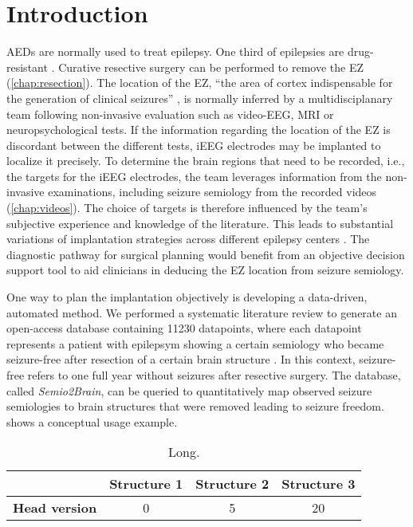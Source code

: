 \section{Introduction}

\Acp{AED} are normally used to treat epilepsy.
One third of epilepsies are drug-resistant \cite{engel_what_2016}.
Curative resective surgery can be performed to remove the \ac{EZ} (\cref{chap:resection}).
The location of the \ac{EZ}, ``the area of cortex indispensable for the generation of clinical seizures'' \cite{rosenow_presurgical_2001}, is normally inferred by a multidisciplanary team following non-invasive evaluation such as video-\ac{EEG}, \ac{MRI} or neuropsychological tests.
If the information regarding the location of the \ac{EZ} is discordant between the different tests, \ac{iEEG} electrodes may be implanted to localize it precisely.
To determine the brain regions that need to be recorded, i.e., the targets for the \ac{iEEG} electrodes, the team leverages information from the non-invasive examinations, including seizure semiology from the recorded videos (\cref{chap:videos}).
The choice of targets is therefore influenced by the team's subjective experience and knowledge of the literature.
This leads to substantial variations of implantation strategies across different epilepsy centers \cite{tufenkjian_seizure_2012}.
The diagnostic pathway for surgical planning would benefit from an objective decision support tool to aid clinicians in deducing the \ac{EZ} location from seizure semiology.

One way to plan the implantation objectively is developing a data-driven, automated method.
We performed a systematic literature review to generate an open-access database containing 11230 datapoints, where each datapoint represents a patient with epilepsym showing a certain semiology who became seizure-free after resection of a certain brain structure \cite{alim-marvasti_probabilistic_2021}.
In this context, seizure-free refers to one full year without seizures after resective surgery.
The database, called \textit{Semio2Brain}, can be queried to quantitatively map observed seizure semiologies to brain structures that were removed leading to seizure freedom.
 shows a conceptual usage example.

\begin{table}
  \setlength{\tabcolsep}{3pt}
  \centering
  \caption[Short]{
    Long.
  }
  \label{tab:single_semiology}
  \begin{tabular}{l*3c}
    \toprule
                          & \textbf{Structure 1} & \textbf{Structure 2} & \textbf{Structure 3} \\
    \midrule
    \textbf{Head version} &                    0 &                    5 &                   20 \\
  \end{tabular}
\end{table}


